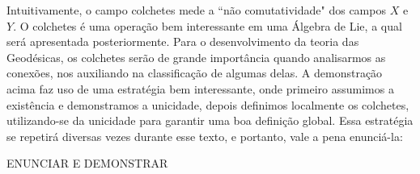 Intuitivamente, o campo colchetes mede a ``não comutatividade" dos campos $X$ e $Y$. O
colchetes é uma operação bem interessante em uma Álgebra de Lie, a qual será
apresentada posteriormente. Para o desenvolvimento da teoria das Geodésicas, os
colchetes serão de grande importância quando analisarmos as conexões, nos auxiliando na
classificação de algumas delas.
A demonstração acima faz uso de uma estratégia bem interessante, onde primeiro
assumimos a existência e demonstramos a unicidade, depois definimos localmente os
colchetes, utilizando-se da unicidade para garantir uma boa definição global. Essa
estratégia se repetirá diversas vezes durante esse texto, e portanto, vale a pena enunciá-la:
\begin{lemma}
    \label{loc:lema_:_definição_local_e_unicidade_levam_a_definição_global}
    ENUNCIAR E DEMONSTRAR
\end{lemma}
